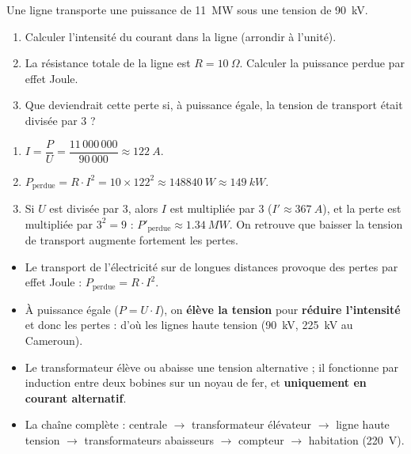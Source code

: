 \documentclass[11pt]{article}
\newcommand{\cle}[1]{{\popxbold\color{popdark}#1}}
\begin{document}
\begin{exercice}
Une ligne transporte une puissance de \SI{11}{MW} sous une tension de \SI{90}{kV}.
\begin{enumerate}
\item Calculer l'intensité du courant dans la ligne (arrondir à l'unité).
\item La résistance totale de la ligne est $R = \SI{10}{\Omega}$. Calculer la puissance perdue par effet Joule.
\item Que deviendrait cette perte si, à puissance égale, la tension de transport était divisée par 3 ?
\end{enumerate}
\end{exercice}

\begin{corrige}
\begin{enumerate}
\item $I = \dfrac{P}{U} = \dfrac{11\,000\,000}{90\,000} \approx \SI{122}{A}$.
\item $P_{\text{perdue}} = R \cdot I^{2} = 10 \times 122^{2} \approx \SI{148840}{W} \approx \SI{149}{kW}$.
\item Si $U$ est divisée par 3, alors $I$ est multipliée par 3 ($I' \approx \SI{367}{A}$), et la perte est multipliée par $3^{2} = 9$ : $P'_{\text{perdue}} \approx \SI{1,34}{MW}$. On retrouve que baisser la tension de transport augmente fortement les pertes.
\end{enumerate}
\end{corrige}

\begin{aretenir}
\begin{itemize}
\item Le transport de l'électricité sur de longues distances provoque des pertes par \cle{effet Joule} : $P_{\text{perdue}} = R \cdot I^{2}$.
\item À puissance égale ($P = U \cdot I$), on \textbf{élève la tension} pour \textbf{réduire l'intensité} et donc les pertes : d'où les lignes haute tension (\SI{90}{kV}, \SI{225}{kV} au Cameroun).
\item Le \cle{transformateur} élève ou abaisse une tension alternative ; il fonctionne par \cle{induction} entre deux bobines sur un noyau de fer, et \textbf{uniquement en courant alternatif}.
\item La chaîne complète : centrale $\rightarrow$ transformateur élévateur $\rightarrow$ ligne haute tension $\rightarrow$ transformateurs abaisseurs $\rightarrow$ compteur $\rightarrow$ habitation (\SI{220}{V}).
\end{itemize}
\end{aretenir}
\end{document}
